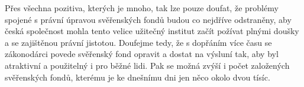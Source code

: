 \documentclass{article}
\begin{document}
Přes všechna pozitiva, kterých je mnoho, tak lze pouze doufat, že problémy spojené s právní úpravou svěřenských fondů budou co nejdříve odstraněny, aby česká společnost mohla tento velice užitečný institut začít požívat plnými doušky a se zajištěnou právní jistotou. Doufejme tedy, že s dopřáním více času se zákonodárci povede svěřenský fond opravit a dostat na výsluní tak, aby byl atraktivní a použitelný i pro běžné lidi. Pak se možná zvýší i počet založených svěřenských fondů, kterému je ke dnešnímu dni jen něco okolo dvou tísíc.\\


\end{document}

